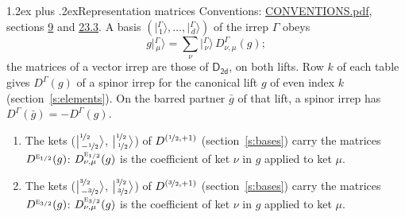 \documentclass[10pt,a4paper]{article}
\makeatletter
\renewcommand\section{\@startsection{section}{1}{\z@}{-3ex plus -1ex minus -.2ex}%
  {1.2ex plus .2ex}{\normalfont\large\sffamily\bfseries\color{parttitle}}}
\numberwithin{equation}{section}
\newcommand{\grp}[1]{\mathsf{#1}}
\newcommand{\irr}[1]{\text{\normalfont\scshape #1}}
\newcommand{\irrJp}[2]{D^{(#1,#2)}}
\newcommand{\repD}[1]{D^{#1}}
\newcommand{\intx}{\mu}
\newcommand{\jm}[2]{\bigl\lvert{}^{#1}_{\,#2}\bigr\rangle}
\newcommand{\irket}[2]{\bigl\lvert{}^{#1}_{\,#2}\bigr\rangle}
\newcommand{\barred}[1]{\bar{#1}}
\newenvironment{romanlist}{\begin{enumerate}%
\renewcommand{\labelenumi}{(\roman{enumi})}}%
  {\end{enumerate}}
\makeatother
\begin{document}
\section{Representation matrices}\label{s:irrep_matrices}
Conventions: \href{../../CONVENTIONS.pdf}{CONVENTIONS.pdf}, sections \href{../../../rotation/CONVENTIONS.pdf\#conv.9}{9} and \href{../../CONVENTIONS.pdf\#conv.23.3}{23.3}.
\leavevmode\label{n:vector.ket.partner}\label{n:index.partner}\label{n:matrix.irrep}\label{n:index.partner.summed}A basis $(\irket{\Gamma}{1}, \dots, \irket{\Gamma}{d})$ of the irrep $\Gamma$ obeys
\begin{equation}\label{e:partner}g\irket{\Gamma}{\intx} = \sum_\nu \irket{\Gamma}{\nu}\, \repD{\Gamma}_{\nu,\intx}(g);\end{equation}
the matrices of a vector irrep are those of \href{../../../rotation/data/pdf/D2d.pdf}{$\grp{D_{2d}}$}, on both lifts. Row $k$ of each table gives $\repD{\Gamma}(g)$ of a spinor irrep for the canonical lift $g$ of even index $k$ (section~\ref{s:elements}). On the barred partner $\barred{g}$ of that lift, a spinor irrep has $\repD{\Gamma}(\barred{g}) = -\repD{\Gamma}(g)$.
\begin{romanlist}\raggedright
\item The kets ($\jm{\nicefrac{1}{2}}{-\nicefrac{1}{2}}$, $\jm{\nicefrac{1}{2}}{\nicefrac{1}{2}}$) of $\irrJp{\nicefrac{1}{2}}{+1}$ (section~\ref{s:bases}) carry the matrices $\repD{\irr{e}_{1/2}}(g)$: $\repD{\irr{e}_{1/2}}_{\nu,\intx}(g)$ is the coefficient of ket $\nu$ in $g$ applied to ket $\intx$.
\item The kets ($\jm{\nicefrac{3}{2}}{-\nicefrac{3}{2}}$, $\jm{\nicefrac{3}{2}}{\nicefrac{3}{2}}$) of $\irrJp{\nicefrac{3}{2}}{+1}$ (section~\ref{s:bases}) carry the matrices $\repD{\irr{e}_{3/2}}(g)$: $\repD{\irr{e}_{3/2}}_{\nu,\intx}(g)$ is the coefficient of ket $\nu$ in $g$ applied to ket $\intx$.
\end{romanlist}
\end{document}
